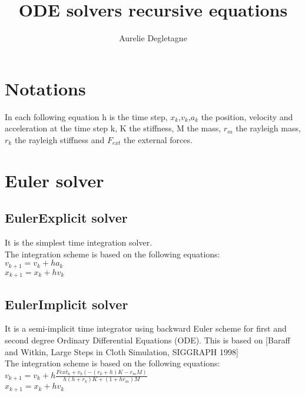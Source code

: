 \documentclass[12pt]{article}
\title{ODE solvers recursive equations}
\author{Aurelie Degletagne}
\begin{document}
\begin{doublespace}

\maketitle
\tableofcontents
\renewcommand{\nomname}{Notations}

\section{Notations}
In each following equation h is the time step, $x_{k}$,$v_{k}$,$a_{k}$   the position, velocity and acceleration at the time step k, K the stiffness, M the mass, $r_{m}$ the rayleigh mass, $r_{k}$ the rayleigh stiffness and $F_{ext}$ the external forces.

\section{Euler solver}

\subsection{EulerExplicit solver}
It is the simplest time integration solver.
\\The integration scheme is based on the following equations:
\\$ v_{k+1} = v_{k}+ha_{k} $
\\$ x_{k+1} = x_{k}+hv_{k} $

\subsection{EulerImplicit solver}
It is a semi-implicit time integrator using backward Euler scheme for first and second degree Ordinary Differential Equations (ODE). 
This is based on [Baraff and Witkin, Large Steps in Cloth Simulation, SIGGRAPH 1998]
\\ The integration scheme is based on the following equations:
\\$ v_{k+1} = v_{k}+h\frac{Fext_{k}+v_{k}(-(r_{k}+h)K-r_{m}M)}{h(h+r_{k})K+(1+hr_{m})M} $
\\$ x_{k+1} = x_{k}+hv_{k} $


\end{doublespace}
\end{document}
